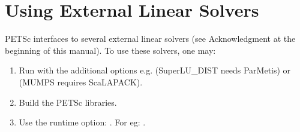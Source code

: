 \section{Using External Linear Solvers}
\label{sec_externalsol}

PETSc interfaces to several external linear solvers (see Acknowledgment at the beginning of this manual).
To use these solvers, one may:

\begin{enumerate}
  \item Run  with the additional options  e.g.   (SuperLU\_DIST needs ParMetis) or
  (MUMPS requires ScaLAPACK).
\item Build the PETSc libraries.
\item Use the runtime option:  
.
For eg:   .
\end{enumerate}

